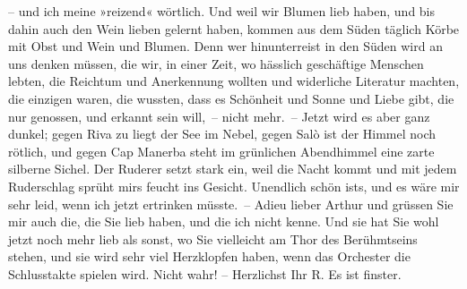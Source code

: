                – und ich meine »reizend« wörtlich. Und weil wir Blumen lieb haben, und bis dahin
               auch den Wein lieben gelernt haben, kommen aus dem Süden täglich Körbe mit Obst und
               Wein und Blumen. Denn wer hinunterreist in den Süden wird an uns denken müssen, die
               wir, in einer Zeit, wo hässlich geschäftige Menschen lebten, die Reichtum und
               Anerkennung wollten und widerliche Literatur machten, die einzigen waren, die
               wussten, dass es Schönheit und Sonne und Liebe gibt, die nur genossen, und erkannt
               sein will, – nicht mehr. – Jetzt wird es aber ganz dunkel; gegen Riva zu liegt der See im Nebel, gegen Salò ist der Himmel noch rötlich, und gegen Cap Manerba steht im grünlichen Abendhimmel eine zarte silberne
                  {\pb}Sichel. Der Ruderer setzt stark ein, weil die
               Nacht kommt und mit jedem Ruderschlag sprüht mirs feucht ins Gesicht. Unendlich schön
               ists, und es wäre mir sehr leid, wenn ich jetzt ertrinken müsste. – Adieu lieber
               Arthur und grüssen Sie mir auch die, die Sie lieb haben, und die ich nicht kenne. Und
               sie hat Sie wohl jetzt noch mehr lieb als sonst, wo Sie vielleicht am Thor des
               Berühmtseins stehen, und sie wird sehr viel Herzklopfen haben, wenn das Orchester die
               Schlusstakte spielen wird. Nicht wahr! – Herzlichst Ihr\pend
           \pstart \spacefill\mbox{R.}\pend{}
\pstart
           \noindent{}Es ist finster.\pend
           \endnumbering{}  \newcommand{\dateiname}{L00493}\newcommand{\titel}{Richard Beer-Hofmann an Arthur Schnitzler, 24. 9. 1895}\newcommand{\editorInnen}{Martin Anton Müller und Gerd-Hermann Susen}
